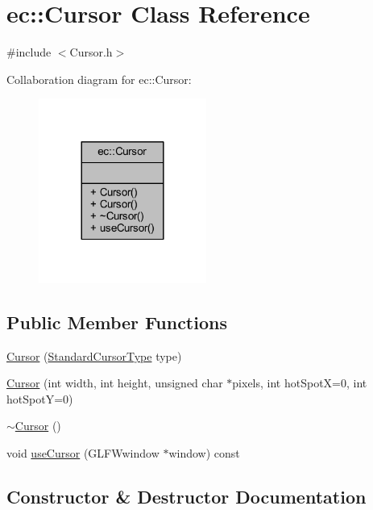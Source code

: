 \hypertarget{classec_1_1_cursor}{}\section{ec\+:\+:Cursor Class Reference}
\label{classec_1_1_cursor}


{\ttfamily \#include $<$Cursor.\+h$>$}



Collaboration diagram for ec\+:\+:Cursor\+:\nopagebreak
\begin{figure}[H]
\begin{center}
\leavevmode
\includegraphics[width=156pt]{classec_1_1_cursor__coll__graph}
\end{center}
\end{figure}
\subsection*{Public Member Functions}
\begin{DoxyCompactItemize}
\item 
\mbox{\hyperlink{classec_1_1_cursor_a7fd103f9e129b2952484999510d8576a}{Cursor}} (\mbox{\hyperlink{namespaceec_ab32dc7f72e1021f7625fca2b4693d297}{Standard\+Cursor\+Type}} type)
\item 
\mbox{\hyperlink{classec_1_1_cursor_adcbabc67fe488264ee580bcae53de8df}{Cursor}} (int width, int height, unsigned char $\ast$pixels, int hot\+SpotX=0, int hot\+SpotY=0)
\item 
\mbox{\hyperlink{classec_1_1_cursor_a4617172c5106164b27ef856df0b078c3}{$\sim$\+Cursor}} ()
\item 
void \mbox{\hyperlink{classec_1_1_cursor_ad99efc837c8f7fb348d2ea7c3bd230d4}{use\+Cursor}} (G\+L\+F\+Wwindow $\ast$window) const
\end{DoxyCompactItemize}


\subsection{Constructor \& Destructor Documentation}
\mbox{\label{classec_1_1_cursor_a7fd103f9e129b2952484999510d8576a}} 
